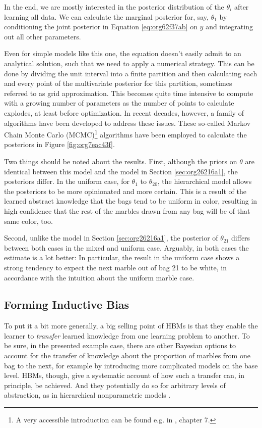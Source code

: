 \documentclass[11pt, a4paper]{article}
\begin{document}
In the end, we are mostly interested in the posterior distribution of the
\(\theta_i\) after learning all data. We can calculate the marginal posterior
for, say, \(\theta_{\text{1}}\) by conditioning the joint posterior in Equation
\ref{eq:org62f37ab} on \(y\) and integrating out all other parameters.

Even for simple models like this one, the equation doesn't easily
admit to an analytical solution, such that we need to apply a numerical
strategy. This can be done by dividing the unit interval into a finite partition
and then calculating each and every point of the multivariate posterior for this
partition, sometimes referred to as grid approximation. This becomes quite time
intensive to compute with a growing number of parameters as the number of points
to calculate explodes, at least before optimization. In recent decades, however,
a family of algorithms have been developed to address these issues. These
so-called Markov Chain Monte Carlo (MCMC)\footnote{A very accessible
  introduction can be found e.g. in \citet{kruschke11_doing_bayes}, chapter 7.}
algorithms have been employed to calculate the posteriors in Figure
\ref{fig:org7eac43f}.

Two things should be noted about the results. First, although the priors on
\(\theta\) are identical between this model and the model in Section
\ref{sec:org26216a1}, the posteriors differ. In the uniform case, for
\(\theta_{\text{1}}\) to \(\theta_{\text{20}}\), the hierarchical model allows
the posteriors to be more opinionated and more certain. This is a result of the
learned abstract knowledge that the bags tend to be uniform in color, resulting
in high confidence that the rest of the marbles drawn from any bag will be of
that same color, too.

Second, unlike the model in Section \ref{sec:org26216a1}, the posterior of
\(\theta_{\text{21}}\) differs between both cases in the mixed and uniform case.
Arguably, in both cases the estimate is a lot better: In particular, the result
in the uniform case shows a strong tendency to expect the next marble out of
bag 21 to be white, in accordance with the intuition about the
uniform marble case.

\subsection{Forming Inductive Bias}
\label{sec:org7d2bfe8}

To put it a bit more generally, a big selling point of HBMs is that they enable
the learner to \emph{transfer} learned knowledge from one learning problem to
another. To be sure, in the presented example case, there are other Bayesian
options to account for the transfer of knowledge about the proportion of marbles
from one bag to the next, for example by introducing more complicated models on
the base level. HBMs, though, give a systematic account of how such a transfer
can, in principle, be achieved. And they potentially do so for arbitrary levels of
abstraction, as in hierarchical nonparametric models \parencite{pmlr-v27-salakhutdinov12a}.
\end{document}
